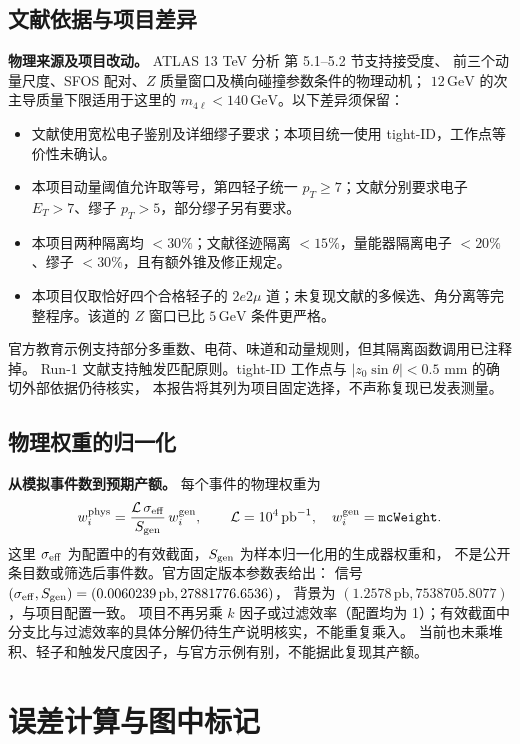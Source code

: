 \documentclass[11pt,a4paper,fontset=fandol,scheme=plain]{ctexart}
\newcommand{\gev}{\,\mathrm{GeV}}
\begin{document}
\subsection{文献依据与项目差异}
\textbf{物理来源及项目改动。} ATLAS 13 TeV 分析\cite{ATLAS13} 第 5.1--5.2 节支持接受度、
前三个动量尺度、SFOS 配对、$Z$ 质量窗口及横向碰撞参数条件的物理动机；
$12\gev$ 的次主导质量下限适用于这里的 $m_{4\ell}<140\gev$。以下差异须保留：
\begin{itemize}[itemsep=1pt,topsep=2pt]
\item 文献使用宽松电子鉴别及详细缪子要求；本项目统一使用 tight-ID，工作点等价性未确认。
\item 本项目动量阈值允许取等号，第四轻子统一 $p_T\geq7$；文献分别要求电子 $E_T>7$、缪子 $p_T>5$，部分缪子另有要求。
\item 本项目两种隔离均 $<30\%$；文献径迹隔离 $<15\%$，量能器隔离电子 $<20\%$、缪子 $<30\%$，且有额外锥及修正规定。
\item 本项目仅取恰好四个合格轻子的 $2e2\mu$ 道；未复现文献的多候选、角分离等完整程序。该道的 $Z$ 窗口已比 $5\gev$ 条件更严格。
\end{itemize}
官方教育示例\cite{HZZCuts,HZZAnalysis}支持部分多重数、电荷、味道和动量规则，但其隔离函数调用已注释掉。
Run-1 文献\cite{ATLASRun1}支持触发匹配原则。tight-ID 工作点与 $|z_0\sin\theta|<0.5$ mm 的确切外部依据仍待核实，
本报告将其列为项目固定选择，不声称复现已发表测量。
\subsection{物理权重的归一化}
\label{app:weights}
\textbf{从模拟事件数到预期产额。} 每个事件的物理权重为
\[
 w_i^{\rm phys}=\frac{\mathcal L\,\sigma_{\rm eff}}{S_{\rm gen}}\,w_i^{\rm gen},
 \qquad \mathcal L=10^4\,\mathrm{pb}^{-1},\quad w_i^{\rm gen}=\texttt{mcWeight}.
\]
这里 $\sigma_{\rm eff}$ 为配置中的有效截面，$S_{\rm gen}$ 为样本归一化用的生成器权重和，
不是公开条目数或筛选后事件数。官方固定版本参数表\cite{SampleInfo}给出：
信号 $(\sigma_{\rm eff},S_{\rm gen})=(0.0060239\,\mathrm{pb},27881776.6536)$，
背景为 $(1.2578\,\mathrm{pb},7538705.8077)$，与项目配置一致。
项目不再另乘 $k$ 因子或过滤效率（配置均为 1）；有效截面中分支比与过滤效率的具体分解仍待生产说明核实，不能重复乘入。
当前也未乘堆积、轻子和触发尺度因子，与官方示例\cite{HZZAnalysis}有别，不能据此复现其产额。
\FloatBarrier

\section{误差计算与图中标记}\label{app:errors}
\end{document}
